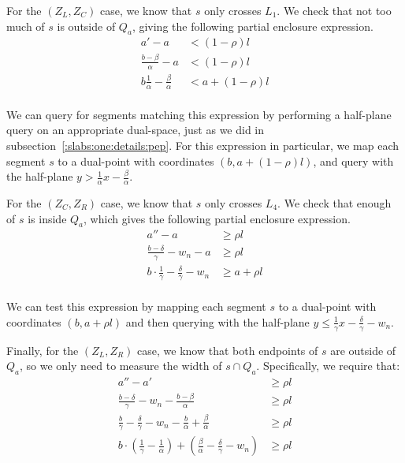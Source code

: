 For the $(Z_L, Z_C)$ case, we know that $s$ only crosses $L_1$.
We check that not too much of $s$ is outside of $Q_a$, giving the following partial enclosure expression.
\[
\begin{split}
a' - a &< (1 - \rho)l \\
%
\frac{b - \beta}{\alpha} - a &< (1 - \rho)l \\
%
b \frac{1}{\alpha} - \frac{\beta}{\alpha} &< a + (1 - \rho)l \\
%
\end{split}
\]

\noindent We can query for segments matching this expression by performing a half-plane query on an appropriate dual-space, just as we did in subsection~\ref{:slabs:one:details:pep}. 
For this expression in particular, we map each segment $s$ to a dual-point with coordinates $(b, a + (1-\rho)l)$, and query with the half-plane $y > \frac{1}{\alpha} x - \frac{\beta}{\alpha}$.

For the $(Z_C, Z_R)$ case, we know that $s$ only crosses $L_4$. 
We check that enough of $s$ is inside $Q_a$, which gives the following partial enclosure expression.
\[
\begin{split}
a'' - a &\geq \rho l \\
%
\frac{b - \delta}{\gamma} - w_n - a &\geq \rho l \\
%
b \cdot \frac{1}{\gamma} - \frac{\delta}{\gamma} - w_n &\geq a + \rho l \\
%
\end{split}
\]

\noindent We can test this expression by mapping each segment $s$ to a dual-point with coordinates $(b, a + \rho l)$ and then querying with the half-plane $y \leq \frac{1}{\gamma} x - \frac{\delta}{\gamma} - w_n$.

Finally, for the $(Z_L, Z_R)$ case, we know that both endpoints of $s$ are outside of $Q_a$, so we only need to measure the width of $s \cap Q_a$.  
Specifically, we require that:
\[
\begin{split} 
a'' - a' &\geq \rho l \\
%
\frac{b - \delta}{\gamma} - w_n - \frac{b - \beta}{\alpha} &\geq \rho l \\
%
\frac{b}{\gamma} - \frac{\delta}{\gamma} - w_n - \frac{b}{\alpha} + \frac{\beta}{\alpha} &\geq \rho l \\
%
b \cdot \left ( \frac{1}{\gamma} - \frac{1}{\alpha} \right ) + \left ( \frac{\beta}{\alpha} - \frac{\delta}{\gamma} - w_n \right ) &\geq \rho l \\
%
\end{split}
\]

